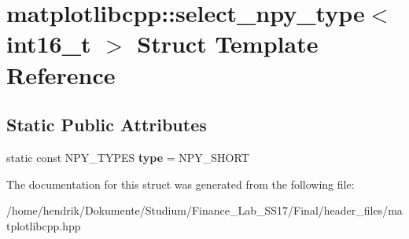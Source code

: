\hypertarget{structmatplotlibcpp_1_1select__npy__type_3_01int16__t_01_4}{}\section{matplotlibcpp\+:\+:select\+\_\+npy\+\_\+type$<$ int16\+\_\+t $>$ Struct Template Reference}
\label{structmatplotlibcpp_1_1select__npy__type_3_01int16__t_01_4}
\subsection*{Static Public Attributes}
\begin{DoxyCompactItemize}
\item 
static const N\+P\+Y\+\_\+\+T\+Y\+P\+ES {\bfseries type} = N\+P\+Y\+\_\+\+S\+H\+O\+RT\hypertarget{structmatplotlibcpp_1_1select__npy__type_3_01int16__t_01_4_aa7e1803c594ccc58c2cd4c8818d5a158}{}\label{structmatplotlibcpp_1_1select__npy__type_3_01int16__t_01_4_aa7e1803c594ccc58c2cd4c8818d5a158}

\end{DoxyCompactItemize}


The documentation for this struct was generated from the following file\+:\begin{DoxyCompactItemize}
\item 
/home/hendrik/\+Dokumente/\+Studium/\+Finance\+\_\+\+Lab\+\_\+\+S\+S17/\+Final/header\+\_\+files/matplotlibcpp.\+hpp\end{DoxyCompactItemize}
